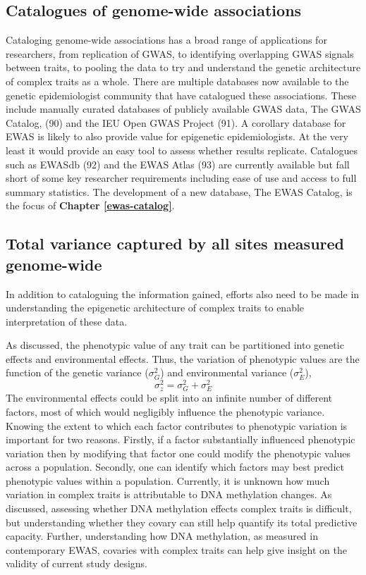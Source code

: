 \documentclass[11pt,oneside]{bristolthesis}
\begin{document}
\hypertarget{gwas-catalog}{%
\subsection{Catalogues of genome-wide associations}\label{gwas-catalog}}

Cataloging genome-wide associations has a broad range of applications for researchers, from replication of GWAS, to identifying overlapping GWAS signals between traits, to pooling the data to try and understand the genetic architecture of complex traits as a whole. There are multiple databases now available to the genetic epidemiologist community that have catalogued these associations. These include manually curated databases of publicly available GWAS data, The GWAS Catalog, (90) and the IEU Open GWAS Project (91). A corollary database for EWAS is likely to also provide value for epigenetic epidemiologists. At the very least it would provide an easy tool to assess whether results replicate. Catalogues such as EWASdb (92) and the EWAS Atlas (93) are currently available but fall short of some key researcher requirements including ease of use and access to full summary statistics. The development of a new database, The EWAS Catalog, is the focus of \textbf{Chapter \ref{ewas-catalog}}.

\hypertarget{heritability}{%
\subsection{Total variance captured by all sites measured genome-wide}\label{heritability}}

In addition to cataloguing the information gained, efforts also need to be made in understanding the epigenetic architecture of complex traits to enable interpretation of these data.

As discussed, the phenotypic value of any trait can be partitioned into genetic effects and environmental effects. Thus, the variation of phenotypic values are the function of the genetic variance (\(\sigma^2_{G}\)) and environmental variance (\(\sigma^2_{E}\)),
\begin{equation}
    \sigma^2_{z} = \sigma^2_{G} + \sigma^2_{E}
    \label{eq:phenotypic-variance}
\end{equation}
The environmental effects could be split into an infinite number of different factors, most of which would negligibly influence the phenotypic variance. Knowing the extent to which each factor contributes to phenotypic variation is important for two reasons. Firstly, if a factor substantially influenced phenotypic variation then by modifying that factor one could modify the phenotypic values across a population. Secondly, one can identify which factors may best predict phenotypic values within a population. Currently, it is unknown how much variation in complex traits is attributable to DNA methylation changes. As discussed, assessing whether DNA methylation effects complex traits is difficult, but understanding whether they covary can still help quantify its total predictive capacity. Further, understanding how DNA methylation, as measured in contemporary EWAS, covaries with complex traits can help give insight on the validity of current study designs.
\end{document}
